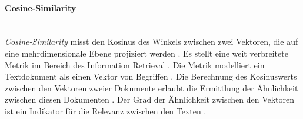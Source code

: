 \paragraph{Cosine-Similarity}\mbox{}\\
\emph{Cosine-Similarity} misst den Kosinus des Winkels zwischen zwei Vektoren, die auf eine mehrdimensionale Ebene projiziert werden \cite{sitikhu2019comparison}. Es stellt eine weit verbreitete Metrik im Bereich des Information Retrieval \cite{rahutomo2012semantic}. Die Metrik modelliert ein Textdokument als einen Vektor von Begriffen \cite{rahutomo2012semantic}. Die Berechnung des Kosinuswerts zwischen den Vektoren zweier Dokumente erlaubt die Ermittlung der Ähnlichkeit zwischen diesen Dokumenten \cite{rahutomo2012semantic}. Der Grad der Ähnlichkeit zwischen den Vektoren ist ein Indikator für die Relevanz zwischen den Texten \cite{rahutomo2012semantic}.

